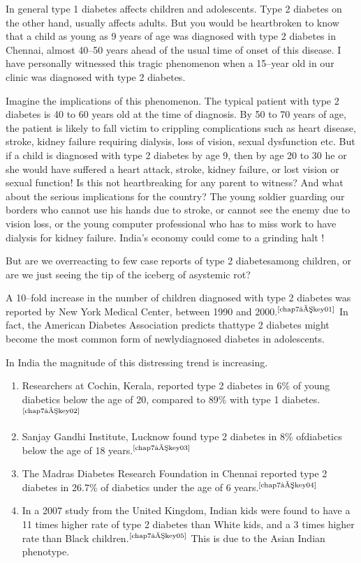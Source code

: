 In general type 1 diabetes affects children and adolescents. Type 2 diabetes on the other hand, usually affects adults. But you would be heartbroken to know that a child as young as 9 years of age was diagnosed with type 2 diabetes in Chennai, almost 40–50 years ahead of the usual time of onset of this disease. I have personally witnessed this tragic phenomenon when a 15–year old in our clinic was diagnosed with type 2 diabetes.

Imagine the implications of this phenomenon. The typical patient with type 2 diabetes is 40 to 60 years old at the time of diagnosis. By 50 to 70 years of age, the patient is likely to fall victim to crippling compli\-cations such as heart disease, stroke, kidney failure requiring dialysis, loss of vision, sexual dysfunction etc. But if a child is dia\-gnosed with type 2 diabetes by age 9, then by age 20 to 30 he or she would have suffered a heart attack, stroke, kidney failure, or lost vision or sexual function! Is this not heartbreaking for any parent to witness? And what about the serious implications for the country? The young soldier gua\-rding our borders who cannot use his hands due to stroke, or cannot see the enemy due to vision loss, or the young computer professional who has to miss work to have dialysis for kidney failure. India’s eco\-nomy could come to a grinding halt !

But are we overreacting to few case reports of type 2 diabetes\break among children, or are we just seeing the tip of the iceberg of a\break systemic rot?

A 10–fold increase in the number of children diagnosed with type 2 diabetes was reported by New York Medical Center, between 1990 and 2000.$^{\text{\cite{chap7–key01}}}$ In fact, the American Diabetes Association predicts that\break type 2 diabetes might become the most common form of newly\break diagnosed diabetes in adolescents.

\noindent In India the magnitude of this distressing trend is increasing.

\vspace{-\topsep}
\begin{enumerate}[•]
\itemsep=0pt
\item Researchers at Cochin, Kerala, reported type 2 diabetes in 6\% of young diabetics below the age of 20, compared to 89\% with type 1 diabetes.$^{\text{\cite{chap7–key02}}}$
\item Sanjay Gandhi Institute, Lucknow found type 2 diabetes in 8\% of\break diabetics below the age of 18 years.$^{\text{\cite{chap7–key03}}}$
\item The Madras Diabetes Research Foundation in Chennai reported type 2 diabetes in 26.7\% of diabetics under the age of 6 years.$^{\text{\cite{chap7–key04}}}$
\item In a 2007 study from the United Kingdom, Indian kids were found to have a 11 times higher rate of type 2 diabetes than White kids, and a 3 times higher rate than Black children.$^{\text{\cite{chap7–key05}}}$ This is due to the Asian Indian phenotype.
 \end{enumerate}
\vspace{-\topsep}


